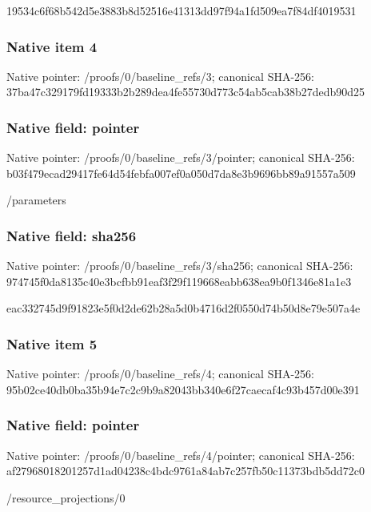 \documentclass[10pt,a4paper]{article}
\begin{document}
\begingroup\raggedright\sloppy 19534c6f68b542d5e3883b8d52516e41313dd97f94a1fd509ea7f84df4019531\par\endgroup

\subsubsection{Native item 4}
Native pointer: /proofs/0/baseline\_\allowbreak{}refs/3; canonical SHA-256: 37ba47c329179fd19333b2b289dea4fe55730d773c54ab5cab38b27dedb90d25

\subsubsection{Native field: pointer}
Native pointer: /proofs/0/baseline\_\allowbreak{}refs/3/pointer; canonical SHA-256: b03f479ecad29417fe64d54febfa007ef0a050d7da8e3b9696bb89a91557a509

\begingroup\raggedright\sloppy /\allowbreak{}parameters\par\endgroup

\subsubsection{Native field: sha256}
Native pointer: /proofs/0/baseline\_\allowbreak{}refs/3/sha256; canonical SHA-256: 974745f0da8135c40e3bcfbb91eaf3f29f119668eabb638ea9b0f1346e81a1e3

\begingroup\raggedright\sloppy eac332745d9f91823e5f0d2de62b28a5d0b4716d2f0550d74b50d8e79e507a4e\par\endgroup

\subsubsection{Native item 5}
Native pointer: /proofs/0/baseline\_\allowbreak{}refs/4; canonical SHA-256: 95b02ce40db0ba35b94e7c2c9b9a82043bb340e6f27caecaf4c93b457d00e391

\subsubsection{Native field: pointer}
Native pointer: /proofs/0/baseline\_\allowbreak{}refs/4/pointer; canonical SHA-256: af27968018201257d1ad04238c4bdc9761a84ab7c257fb50c11373bdb5dd72c0

\begingroup\raggedright\sloppy /\allowbreak{}resource\_\allowbreak{}projections/\allowbreak{}0\par\endgroup
\end{document}

